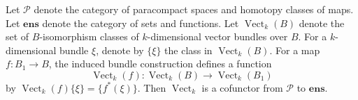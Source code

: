 Let $\mathcal{P}$ denote the category of paracompact spaces and homotopy classes of maps. Let $\mathbf{ens}$ denote the category of sets and functions. Let $\operatorname{Vect}_k(B)$ denote the set of $B$-isomorphism classes of $k$-dimensional vector bundles over $B$. For a $k$-dimensional bundle $\xi$, denote by $\{\xi\}$ the class in $\operatorname{Vect}_k(B)$. For a map $f: B_1 \to B$, the induced bundle construction defines a function
$$
\operatorname{Vect}_k(f): \operatorname{Vect}_k(B) \to \operatorname{Vect}_k(B_1)
$$
by $\operatorname{Vect}_k(f)\{\xi\} = \{f^*(\xi)\}$. Then $\operatorname{Vect}_k$ is a cofunctor from $\mathcal{P}$ to $\mathbf{ens}$.

